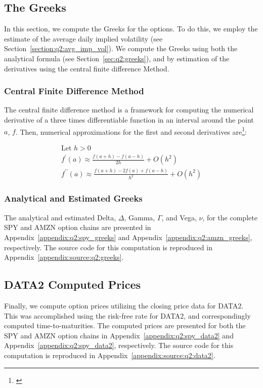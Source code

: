 \documentclass[10pt]{article}
\begin{document}
    
    \newpage
    \subsection{The Greeks}

    In this section, we compute the Greeks for the options. To do this, we employ the estimate of the average daily implied volatility (see Section~\ref{section:q2:avg_imp_vol}). We compute the Greeks using both the analytical formula (see Section~\ref{sec:q2:greeks}), and by estimation of the derivatives using the central finite difference Method.

        \subsubsection{Central Finite Difference Method}

        The central finite difference method is a framework for computing the numerical derivative of a three times differentiable function in an interval around the point $a$, $f$. Then, numerical approximations for the first and second derivatives are\footnote{\cite{Stefanica2011}}:
        
        \begin{gather*}
            \text{Let } h > 0 \\
            f^\prime(a) \approx \frac{f(a + h) - f(a - h)}{2h} + O(h^2) \\
            f^{\prime\prime}(a) \approx \frac{f(a + h) - 2 f(a) + f(a - h)}{h^2} + O(h^2)
        \end{gather*}


        \subsubsection{Analytical and Estimated Greeks}

        The analytical and estimated Delta, $\Delta$, Gamma, $\Gamma$, and Vega, $\nu$, for the complete SPY and AMZN option chains are presented in Appendix~\ref{appendix:q2:spy_greeks} and Appendix~\ref{appendix:q2:amzn_greeks}, respectively. The source code for this computation is reproduced in Appendix~\ref{appendix:source:q2:greeks}.

    \subsection{DATA2 Computed Prices}

    Finally, we compute option prices utilizing the closing price data for DATA2. This was accomplished using the risk-free rate for DATA2, and correspondingly computed time-to-maturities. The computed prices are presented for both the SPY and AMZN option chains in Appendix~\ref{appendix:q2:spy_data2} and Appendix~\ref{appendix:q2:spy_data2}, respectively. The source code for this computation is reproduced in Appendix~\ref{appendix:source:q2:data2}.
\end{document}
